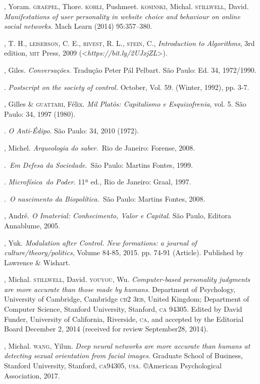 \begin{bibliohedra}
, Yoram. \textsc{graepel}, Thore. \textsc{kohli}, Pushmeet. \textsc{kosinski}, Michal.
\textsc{stillwell}, David. \emph{Manifestations of user personality in website
choice and behaviour on online social networks}. Mach Learn (2014) 95:357--380.

, T. H., \textsc{leiserson}, C. E., \textsc{rivest}, R. L., \textsc{stein}, C.,
\emph{Introduction to Algorithms}, 3rd edition, \textsc{mit} Press, 2009
(\textless{}\emph{https://bit.ly/2UJxjZL}\textgreater{}).

, Giles. \emph{Conversações}. Tradução Peter Pál Pelbart. São Paulo: Ed. 34,  1972/1990.

\titidem. \emph{Postscript on the society of control.} October,
Vol. 59. (Winter, 1992), pp. 3-7.

, Gilles \& \textsc{guattari}, Félix. \emph{Mil Platôs: Capitalismo e
Esquizofrenia}, vol. 5. São Paulo: 34, 1997 (1980).

\titidem. \emph{O Anti-Édipo.} São Paulo: 34, 2010 (1972).

, Michel. \emph{Arqueologia do saber.}~Rio de Janeiro:
Forense, 2008.

\titidem.~\emph{Em Defesa da Sociedade}.~São Paulo: Martins
Fontes, 1999.

\titidem. \emph{Microfísica~do Poder.} 11ª ed., Rio de
Janeiro: Graal, 1997.

\titidem.~\emph{O nascimento da Biopolítica.}~São Paulo:
Martins Fontes, 2008.

, André. \emph{O Imaterial: Conhecimento, Valor e Capital}. São
Paulo, Editora Annablume, 2005.

, Yuk. \emph{Modulation after Control. New formations: a journal of
culture/theory/politics}, Volume 84-85, 2015. pp. 74-91 (Article).
Published by Lawrence \& Wishart.

, Michal. \textsc{stillwell}, David. \textsc{youyou}, Wu. \emph{Computer-based
personality judgments are more accurate than those made by
humans}. Department of Psychology, University of Cambridge, Cambridge \textsc{cb}2
3\textsc{eb}, United Kingdom; Department of Computer Science, Stanford
University, Stanford, \textsc{ca} 94305. Edited by David Funder, University of
California, Riverside, \textsc{ca}, and accepted by the Editorial Board December
2, 2014 (received for review September28, 2014).

, Michal. \textsc{wang}, Yilun. \emph{Deep neural networks are more
accurate than humans at detecting sexual orientation from facial
images}. Graduate School of Business, Stanford University,
Stanford, \textsc{ca}94305, \textsc{usa}. ©American Psychological Association, 2017.


\end{bibliohedra}
